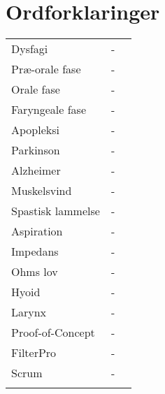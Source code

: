 
\chapter{Ordforklaringer}

\begin{table}[H]
\center
{}
\begin{tabularx}{\linewidth}{l l X}	
Dysfagi			& - &   \\ \addlinespace[2mm]
Præ-orale fase	& - &   \\ \addlinespace[2mm]
Orale fase		& - &   \\ \addlinespace[2mm]
Faryngeale fase	& - &   \\ \addlinespace[2mm]
Apopleksi& - &   \\ \addlinespace[2mm]
Parkinson& - &   \\ \addlinespace[2mm]
Alzheimer& - &   \\ \addlinespace[2mm]
Muskelsvind& - &   \\ \addlinespace[2mm]
Spastisk lammelse& - &   \\ \addlinespace[2mm]
Aspiration& - &   \\ \addlinespace[2mm]
Impedans& - &   \\ \addlinespace[2mm]
Ohms lov& - &   \\ \addlinespace[2mm]
Hyoid& - &   \\ \addlinespace[2mm]
Larynx& - &   \\ \addlinespace[2mm]
Proof-of-Concept& - &   \\ \addlinespace[2mm]

FilterPro  		& - &   \\ \addlinespace[2mm]
Scrum 			& - &   \\ \addlinespace[2mm]

\end{tabularx}
\end{table}


